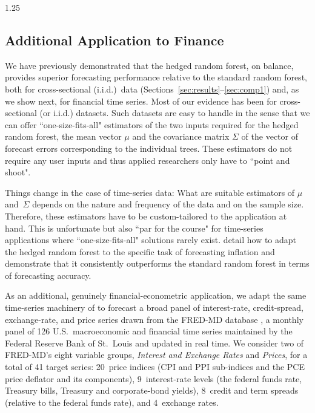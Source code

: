 \documentclass[12pt]{article}
\numberwithin{equation}{section}
\theoremstyle{plain}
\begin{document}
\begin{spacing}{1.25}
\subsection{Additional Application to Finance}
\label{sec:fredmd}

We have previously demonstrated that the hedged random forest, on
balance, provides superior forecasting performance relative to the
standard random forest{\color{blue}, both for cross-sectional (i.i.d.)\ data (Sections~\ref{sec:results}--\ref{sec:comp1}) and, as we show next, for financial time series}. {\color{blue}Most of our} evidence
has been for cross-sectional (or i.i.d.) datasets.
Such datasets are easy to handle in the sense that we can offer ``one-size-fits-all" estimators of the two inputs required for the hedged random forest, the mean vector $\mu$  and the covariance matrix $\Sigma$ of the vector of forecast errors corresponding to the individual trees. These estimators do not require any user inputs and thus applied researchers only have to ``point and shoot".

Things change in the case of time-series data: What are suitable estimators of $\mu$  and~$\Sigma$ depends on the nature and frequency of the data and on the sample size. Therefore, these estimators have to be custom-tailored to the application at hand. This is unfortunate but also ``par for the course" for time-series applications where ``one-size-fits-all" solutions rarely exist. \cite{beck:wolf:hrf-inf} detail how to adapt the hedged random forest to the specific task of forecasting inflation and demonstrate that it consistently outperforms the standard random forest in terms of forecasting accuracy.

{\color{blue}
As an additional, genuinely financial-econometric application, we adapt the same time-series machinery of \cite{beck:wolf:hrf-inf} to forecast a broad panel of interest-rate, credit-spread, exchange-rate, and price series drawn from the FRED-MD database \citep{mccracken:ng:2016}, a monthly panel of 126 U.S.\ macroeconomic and financial time series maintained by the Federal Reserve Bank of St.\ Louis and updated in real time. We consider two of FRED-MD's eight variable groups, \emph{Interest and Exchange Rates} and \emph{Prices}, for a total of 41 target series: 20~price indices (CPI and PPI sub-indices and the PCE price deflator and its components), 9~interest-rate levels (the federal funds rate, Treasury bills, Treasury and corporate-bond yields), 8~credit and term spreads (relative to the federal funds rate), and 4~exchange rates.

}
\end{spacing}
\end{document}
